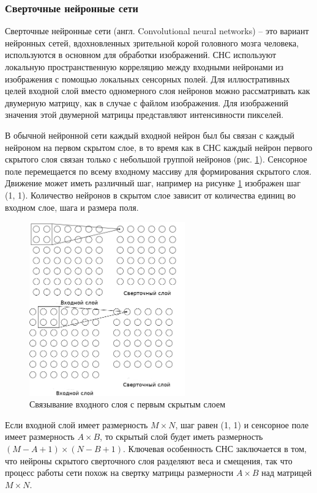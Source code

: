 \subsubsection{Сверточные нейронные сети}

Сверточные нейронные сети (англ. Convolutional neural networks) -- это вариант нейронных сетей, вдохновленных зрительной корой головного мозга человека\cite{Hubel}, используются в основном для обработки изображений. СНС используют локальную пространственную корреляцию между входными нейронами из изображения с помощью локальных сенсорных полей. Для иллюстративных целей входной слой вместо одномерного слоя нейронов можно рассматривать как двумерную матрицу, как в случае с файлом изображения. Для изображений значения этой двумерной матрицы представляют интенсивности пикселей. 

В обычной нейронной сети каждый входной нейрон был бы связан с каждый нейроном на первом скрытом слое, в то время как в СНС каждый нейрон первого скрытого слоя связан только с небольшой группой нейронов (рис. \ref{anal:CNN-first}). Сенсорное поле перемещается по всему входному массиву для формирования скрытого слоя. Движение может иметь различный шаг, например на рисунке \ref{anal:CNN-first} изображен шаг (1, 1). Количество нейронов в скрытом слое зависит от количества единиц во входном слое, шага и размера поля.

\begin{figure}
	\centering
	\includegraphics[width=0.6\textwidth]{inc/img/cnn-first.png}
	\caption{Связывание входного слоя с первым скрытым слоем}
	\label{anal:CNN-first}
\end{figure}

Если входной слой имеет размерность $M \times N$, шаг равен (1, 1) и сенсорное поле имеет размерность $A \times B$, то скрытый слой будет иметь размерность $(M - A + 1) \times (N - B + 1)$. Ключевая особенность СНС заключается в том, что нейроны скрытого сверточного слоя разделяют веса и смещения, так что процесс работы сети похож на свертку матрицы размерности $A \times B$ над матрицей $M\times N$.

